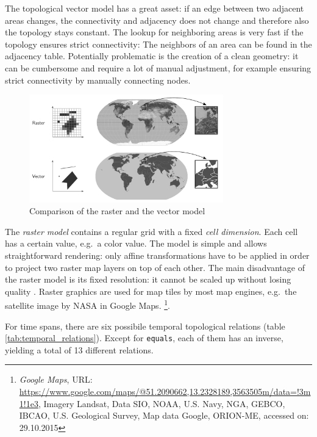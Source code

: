 The topological vector model has a great asset: if an edge between two adjacent areas changes, the connectivity and adjacency does not change and therefore also the topology stays constant. The lookup for neighboring areas is very fast if the topology ensures strict connectivity: The neighbors of an area can be found in the adjacency table. Potentially problematic is the creation of a clean geometry: it can be cumbersome and require a lot of manual adjustment, for example ensuring strict connectivity by manually connecting nodes.




\begin{figure}[H]
  \centering
  \includegraphics[width=0.75\textwidth]{graphics/basics/hgis/raster_vector}
  \caption{Comparison of the raster and the vector model}
  \label{fig:raster_vector}
\end{figure}

The \emph{raster model} contains a regular grid with a fixed \emph{cell dimension}. Each cell has a certain value, e.g.\ a color value.
The model is simple and allows straightforward rendering: only affine transformations have to be applied in order to project two raster map layers on top of each other. The main disadvantage of the raster model is its fixed resolution: it cannot be scaled up without losing quality
\cite[pp.42-48]{bolstad2008gis}.
Raster graphics are used for map tiles by most map engines, e.g.\ the satellite image by NASA in Google Maps.
\footnote{
  \emph{Google Maps},
  URL: \url{https://www.google.com/maps/@51.2090662,13.2328189,3563505m/data=!3m1!1e3},
  Imagery  Landsat, Data SIO, NOAA, U.S. Navy, NGA, GEBCO, IBCAO, U.S. Geological Survey, Map data  Google, ORION-ME,
  accessed on: 29.10.2015
}.


For time spans, there are six possibile temporal topological relations (table \ref{tab:temporal_relations}). Except for \texttt{equals}, each of them has an inverse, yielding a total of 13 different relations.

